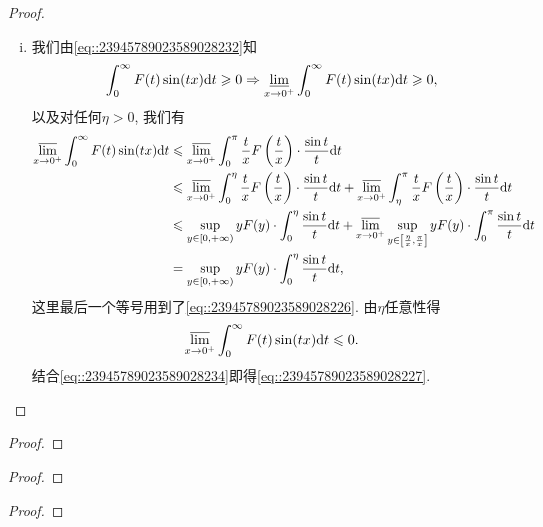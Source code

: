\documentclass[../../main.tex]{subfiles}
\begin{document}
\begin{proof}
\begin{enumerate}[(i)]
\item 我们由\eqref{eq::23945789023589028232}知
\begin{align}
\int_0^\infty F(t)\sin(tx)\mathrm{d}t \geqslant 0 \Rightarrow \varliminf_{x \to 0^+} \int_0^\infty F(t)\sin(tx)\mathrm{d}t \geqslant 0, \label{eq::23945789023589028234}
\end{align}
以及对任何$\eta > 0$, 我们有
\begin{align*}
\varlimsup_{x \to 0^+} \int_0^\infty F(t)\sin(tx)\mathrm{d}t &\leqslant \varlimsup_{x \to 0^+} \int_0^\pi \frac{t}{x}F\left(\frac{t}{x}\right) \cdot \frac{\sin t}{t}\mathrm{d}t \\
&\leqslant \varlimsup_{x \to 0^+} \int_0^\eta \frac{t}{x}F\left(\frac{t}{x}\right) \cdot \frac{\sin t}{t}\mathrm{d}t + \varlimsup_{x \to 0^+} \int_\eta^\pi \frac{t}{x}F\left(\frac{t}{x}\right) \cdot \frac{\sin t}{t}\mathrm{d}t \\
&\leqslant \sup_{y \in [0,+\infty)} yF(y) \cdot \int_0^\eta \frac{\sin t}{t}\mathrm{d}t + \varlimsup_{x \to 0^+} \sup_{y \in \left[ \frac{\eta}{x}, \frac{\pi}{x} \right]} yF(y) \cdot \int_0^\pi \frac{\sin t}{t}\mathrm{d}t \\
&= \sup_{y \in [0,+\infty)} yF(y) \cdot \int_0^\eta \frac{\sin t}{t}\mathrm{d}t,
\end{align*}
这里最后一个等号用到了\eqref{eq::23945789023589028226}. 由$\eta$任意性得
\[
\varlimsup_{x \to 0^+} \int_0^\infty F(t)\sin(tx)\mathrm{d}t \leqslant 0.
\]
结合\eqref{eq::23945789023589028234}即得\eqref{eq::23945789023589028227}.
\end{enumerate}

\end{proof}

\begin{example}

\end{example}
\begin{proof}


\end{proof}

\begin{example}

\end{example}
\begin{proof}


\end{proof}

\begin{example}

\end{example}
\begin{proof}


\end{proof}
\end{document}
